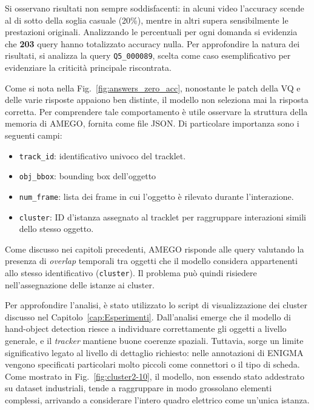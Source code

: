 Si osservano risultati non sempre soddisfacenti: in alcuni video l'accuracy scende al di sotto della soglia casuale (20\%), 
mentre in altri supera sensibilmente le prestazioni originali. 
Analizzando le percentuali per ogni domanda si evidenzia che \textbf{203} query hanno totalizzato accuracy nulla. 
Per approfondire la natura dei risultati, si analizza la query \texttt{Q5\_000089}, scelta come caso esemplificativo per evidenziare la criticità principale riscontrata.

Come si nota nella Fig.~\ref{fig:answers_zero_acc}, nonostante le patch della VQ e delle varie risposte appaiono ben distinte, il modello non seleziona mai la risposta corretta. Per comprendere tale comportamento è utile osservare la struttura della memoria di AMEGO, fornita come file JSON. Di particolare importanza sono i seguenti campi:
\begin{itemize}
    \item \texttt{track\_id}: identificativo univoco del tracklet.
    \item \texttt{obj\_bbox}: bounding box dell'oggetto
    \item \texttt{num\_frame}: lista dei frame in cui l'oggetto è rilevato durante l'interazione.
    \item \texttt{cluster}: ID d'istanza assegnato al tracklet per raggruppare interazioni simili dello stesso oggetto.
\end{itemize}

Come discusso nei capitoli precedenti, AMEGO risponde alle query valutando la presenza di \emph{overlap} temporali tra oggetti che il modello considera appartenenti allo stesso identificativo (\texttt{cluster}). Il problema può quindi risiedere nell'assegnazione delle istanze ai cluster.  

Per approfondire l'analisi, è stato utilizzato lo script di visualizzazione dei cluster discusso nel Capitolo~\ref{cap:Esperimenti}. Dall'analisi emerge che il modello di hand-object detection riesce a individuare correttamente gli oggetti a livello generale, e il \emph{tracker} mantiene buone coerenze spaziali. Tuttavia, sorge un limite significativo legato al livello di dettaglio richiesto: nelle annotazioni di ENIGMA vengono specificati particolari molto piccoli come connettori o il tipo di scheda. Come mostrato in Fig.~\ref{fig:cluster2-10}, il modello, non essendo stato addestrato su dataset industriali, tende a raggruppare in modo grossolano elementi complessi, arrivando a considerare l'intero quadro elettrico come un'unica istanza.

